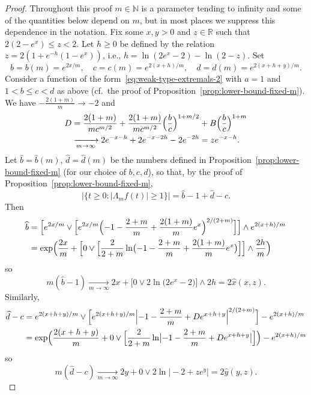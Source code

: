 \documentclass[a4paper]{amsart} %
\theoremstyle{definition}
\theoremstyle{remark}
\numberwithin{equation}{section}
\newcommand*{\RR}{\mathbb{R}}
\newcommand*{\NN}{\mathbb{N}}
\newcommand*{\dZero}{B}%
\newcommand*{\dOne}{D}%
\newcommand*{\bGain}{\widehat{b}}
\newcommand*{\dGain}{\widehat{d}}
\newcommand*{\xGain}{\hat{x}}
\newcommand*{\yGain}{\hat{y}}
\begin{document}
\begin{proof}
	Throughout this proof $m\in\NN$ is a parameter tending to infinity 
	and some of the quantities below  depend on $m$,
	but in most places we suppress this dependence in the notation.
	Fix some $x, y >0$ and $z\in\RR$ such that $2(2-e^x) \leq z < 2$.
	Let $h\geq 0$ be defined by the relation $z = 2(1 + e^{-h}(1-e^x))$, i.e.,
	$ h = \ln(2 e^x - 2) - \ln(2-z)$.
	Set
	\begin{equation*}
	b = b(m) = e^{2x/m},\quad
	c = c(m)  =e^{2(x+h)/m},\quad
	d = d(m) = e^{2(x+h+y)/m}.
	\end{equation*}
	Consider a function of the form~\eqref{eq:weak-type-extremals-2}
	with $a=1$ and $1 < b\leq c < d$ as above
	(cf.~the proof of Proposition~\ref{prop:lower-bound-fixed-m}).
	We have 
	$ -\frac{2(1+m)}{m} \longrightarrow -2$ 
	and
	\begin{align*}
	\dOne &= \frac{2(1+m)}{m c^{m/2}} +  \frac{2(1+m)}{m c^{m/2}} \Bigl(\frac{b}{c}\Bigr)^{1+m/2}+ \dZero\Bigl(\frac{b}{c}\Bigr)^{1+m}\\
	& \xrightarrow[m\to\infty]{}
	2 e^{-x-h} + 2 e^{-x-2h} - 2 e^{-2h}
	=  z e^{-x-h}. 
	\end{align*}
	Let $\bGain = \bGain(m)$, $\dGain=\dGain(m)$ be the numbers defined in Proposition~\ref{prop:lower-bound-fixed-m} (for our choice of $b, c, d$),
	so that, by the proof of Proposition~\ref{prop:lower-bound-fixed-m}, 
	\begin{equation*}
	\bigl|\{ t\geq 0 : |\Lambda_m f (t)| \geq 1 \} \bigr| 
	= \bGain - 1 + \dGain - c. 
	\end{equation*}
	Then
	\begin{align*}
	\bGain 
	&=\Bigl[ e^{2x/m}\lor \Bigl[ e^{2x/m}\Bigl(-1 -\frac{2+m}{m} + \frac{2(1+m)}{m} e^x\Bigr)^{2/(2+m)}\Bigr]\Bigr] \land e^{2(x+h)/m} \\
	&=\exp\Bigl(\frac{2x}{m} + \Bigl[0\lor \Bigl[\frac{2}{2+m}\ln\bigl(-1 -\frac{2+m}{m} + \frac{2(1+m)}{m} e^x\bigr)\Bigr]\Bigr]\land \frac{2h}{m} \Bigr) 
	\end{align*}
	so
	\[
	m(\bGain - 1)
	\xrightarrow[m\to\infty]{}
	2x + \bigl[0\lor 2\ln\bigl(2e^x - 2\bigr)\bigr]\land 2h = 2\xGain(x,z).
	\]
	Similarly,
	\begin{align*}
	\dGain - c
	&= e^{2(x+h+y)/m}\lor \Bigl[ e^{2(x+h+y)/m}\Bigl| - 1 - \frac{2+m}{m} + \dOne e^{x+h+y} \Bigr|^{2/(2+m)}\Bigr]
	- e^{2(x+h)/m}\\
	&=\exp\Bigl(\frac{2(x+h+y)}{m} + 0\lor \Bigl[ \frac{2}{2+m}\ln\bigl|-1 -\frac{2+m}{m} + \dOne e^{x+h+y}\bigr|\Bigr] \Bigr) - e^{2(x+h)/m}
	\end{align*}
	so 
	\[
	m(\dGain - c) 
	\xrightarrow[m\to\infty]{} 
	2y + 0\lor 2\ln\bigl|-2 +  z e^{y}\big| = 2\yGain(y,z).
	\]
	

\end{proof}
\end{document}
